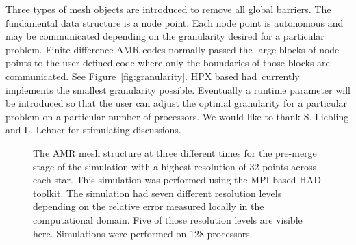 \documentclass[prd,aps,showpacs,nofootinbib,floats,floatfix,twocolumn,letterpaper]{revtex4}
\newcommand{\had}{{\sc had}}
\begin{document}
Three types of mesh objects are introduced to remove all global barriers.  The fundamental
data structure is a node point.  Each node point is autonomous and may be communicated
depending on the granularity desired for a particular problem.  
Finite difference AMR codes normally passed the large blocks of node points to the user defined
code where only the boundaries of those blocks are communicated.  See Figure~\ref{fig:granularity}.
HPX based \had\ currently implements the smallest granularity possible.  Eventually 
a runtime parameter will be introduced so that the user can adjust the optimal granularity for a
particular problem on a particular number of processors.
%
%
We would like to thank
S. Liebling and L. Lehner for
 stimulating  discussions.

%
%



\begin{figure}
\caption{The AMR mesh structure at three different times for the
    pre-merge stage of the simulation with
      a highest resolution of 32 points across each star. This simulation
      was performed using the MPI based HAD toolkit.
    The simulation had seven different resolution levels depending on the relative
error measured locally in the computational domain.  Five of those resolution levels are visible
here.  Simulations were performed on 128 processors.} \label{fig:amr_mesh}
\end{figure}
\end{document}
